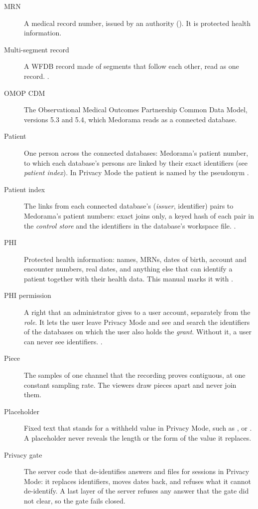 \begin{description}
\item[MRN] A medical record number, issued by an authority (). It is
  protected health information.
\item[Multi-segment record] A WFDB record made of segments that follow each other, read as one
  record. .
\item[OMOP CDM] The Observational Medical Outcomes Partnership Common Data Model, versions 5.3 and
  5.4, which Medorama reads as a connected database.
\item[Patient] One person across the connected databases: Medorama's patient number, to which
  each database's persons are linked by their exact identifiers (see \textit{patient index}). In
  Privacy Mode the patient is named by the pseudonym .
\item[Patient index] The links from each connected database's (\textit{issuer}, identifier)
  pairs to Medorama's patient numbers: exact joins only, a keyed hash of each pair in the
  \textit{control store} and the identifiers in the database's workspace file.
  .
\item[PHI] Protected health information: names, MRNs, dates of birth, account and encounter
  numbers, real dates, and anything else that can identify a patient together with their health
  data. This manual marks it with \phimark.
\item[PHI permission] A right that an administrator gives to a user account, separately from the
  \textit{role}. It lets the user leave Privacy Mode and see and search the identifiers of the
  databases on which the user also holds the  \textit{grant}. Without it, a user can
  never see identifiers. .
\item[Piece] The samples of one channel that the recording proves contiguous, at one constant
  sampling rate. The viewers draw pieces apart and never join them.
\item[Placeholder] Fixed text that stands for a withheld value in Privacy Mode, such as
  , \code{[MRN]} or \code{[Withheld]}. A placeholder never reveals the length
  or the form of the value it replaces.
\item[Privacy gate] The server code that de-identifies answers and files for sessions in Privacy
  Mode: it replaces identifiers, moves dates back, and refuses what it cannot de-identify. A last
  layer of the server refuses any answer that the gate did not clear, so the gate fails closed.

\end{description}
